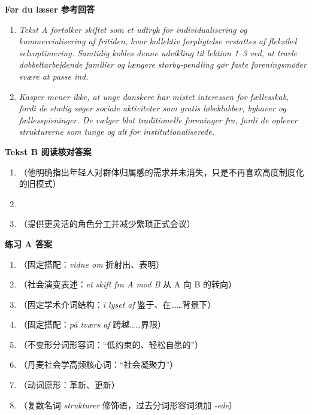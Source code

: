 \begin{answerbox}
\textbf{Før du læser 参考回答}
\begin{enumerate}
  \item \textit{Tekst A fortolker skiftet som et udtryk for individualisering og kommercialisering af fritiden, hvor kollektiv forpligtelse erstattes af fleksibel selvoptimering. Samtidig kobles denne udvikling til lektion 1--3 ved, at travle dobbeltarbejdende familier og længere storby-pendling gør faste foreningsmøder svære at passe ind.}
  \item \textit{Kasper mener ikke, at unge danskere har mistet interessen for fællesskab, fordi de stadig søger sociale aktiviteter som gratis løbeklubber, byhaver og fællesspisninger. De vælger blot traditionelle foreninger fra, fordi de oplever strukturerne som tunge og alt for institutionaliserede.}
\end{enumerate}

\textbf{Tekst B 阅读核对答案}
\begin{enumerate}
  \item {}（他明确指出年轻人对群体归属感的需求并未消失，只是不再喜欢高度制度化的旧模式）
  \item {}
  \item {}（提供更灵活的角色分工并减少繁琐正式会议）
\end{enumerate}

\textbf{练习 A 答案}
\begin{enumerate}
  \item {}（固定搭配：\textit{vidne om} 折射出、表明）
  \item {}（社会演变表述：\textit{et skift fra A mod B} 从 A 向 B 的转向）
  \item {}（固定学术介词结构：\textit{i lyset af} 鉴于、在……背景下）
  \item {}（固定搭配：\textit{på tværs af} 跨越……界限）
  \item {}（不变形分词形容词：“低约束的、轻松自愿的”）
  \item {}（丹麦社会学高频核心词：“社会凝聚力”）
  \item {}（动词原形：革新、更新）
  \item {}（复数名词 \textit{strukturer} 修饰语，过去分词形容词须加 \textit{-ede}）
\end{enumerate}


\end{answerbox}
